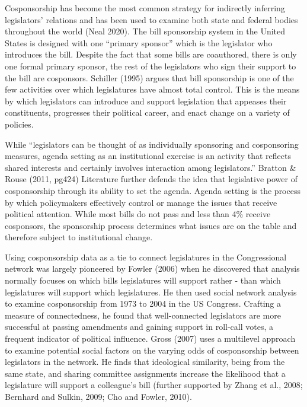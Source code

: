 \documentclass[Royal,times,sageh]{sagej}
\begin{document}
Cosponsorship has become the most common strategy for indirectly
inferring legislators' relations and has been used to examine both state
and federal bodies throughout the world (Neal 2020). The bill
sponsorship system in the United States is designed with one ``primary
sponsor'' which is the legislator who introduces the bill. Despite the
fact that some bills are coauthored, there is only one formal primary
sponsor, the rest of the legislators who sign their support to the bill
are cosponsors. Schiller (1995) argues that bill sponsorship is one of
the few activities over which legislatures have almost total control.
This is the means by which legislators can introduce and support
legislation that appeases their constituents, progresses their political
career, and enact change on a variety of policies.

While ``legislators can be thought of as individually sponsoring and
cosponsoring measures, agenda setting as an institutional exercise is an
activity that reflects shared interests and certainly involves
interaction among legislators.'' Bratton \& Rouse (2011, pg424)
Literature further defends the idea that legislative power of
cosponsorship through its ability to set the agenda. Agenda setting is
the process by which policymakers effectively control or manage the
issues that receive political attention. While most bills do not pass
and less than 4\% receive cosponsors, the sponsorship process determines
what issues are on the table and therefore subject to institutional
change.

Using cosponsorship data as a tie to connect legislatures in the
Congressional network was largely pioneered by Fowler (2006) when he
discovered that analysis normally focuses on which bills legislatures
will support rather - than which legislatures will support which
legislatures. He then used social network analysis to examine
cosponsorship from 1973 to 2004 in the US Congress. Crafting a measure
of connectedness, he found that well-connected legislators are more
successful at passing amendments and gaining support in roll-call votes,
a frequent indicator of political influence. Gross (2007) uses a
multilevel approach to examine potential social factors on the varying
odds of cosponsorship between legislators in the network. He finds that
ideological similarity, being from the same state, and sharing committee
assignments increase the likelihood that a legislature will support a
colleague's bill (further supported by Zhang et al., 2008; Bernhard and
Sulkin, 2009; Cho and Fowler, 2010).
\end{document}
